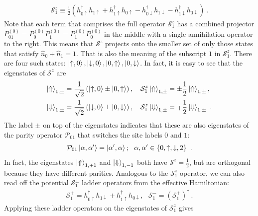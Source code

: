 \documentclass{iopart}
\begin{document}
\begin{eqnarray}
	\mathcal{S}^z_1 \equiv \frac{1}{2}\left(h^\dagger_{0 \uparrow} h_{1 \uparrow}+ h^\dagger_{1 \uparrow} h_{0 \uparrow} - h^\dagger_{0 \downarrow} h_{1 \downarrow} - h^\dagger_{1 \downarrow} h_{0 \downarrow}\right)~.
\end{eqnarray}
Note that each term that comprises the full operator \(\mathcal{S}^z_1\) has a combined projector \(P_{01}^{(0)} = P_0^{(0)}P_1^{(0)} = P_1^{(0)}P_0^{(0)}\) in the middle with a single annihilation operator to the right. This means that \(\mathcal{S}^z\) projects onto the smaller set of only those states that satisfy \(\hat n_0 + \hat n_1 = 1\). That is also the meaning of the subscript \(1\) in \(\mathcal{S}^z_1\). There are four such states: \(\ket{\uparrow, 0}, \ket{\downarrow,0}, \ket{0,\uparrow}, \ket{0, \downarrow}\). In fact, it is easy to see that the eigenstates of \(\mathcal{S}^z\) are
\begin{eqnarray}
	\label{sigmaz-def}
	\ket{\Uparrow}_{1,\pm} &= \frac{1}{\sqrt 2}\left(\ket{\uparrow,0} \pm \ket{0, \uparrow}\right), \quad \mathcal{S}^z_1\ket{\Uparrow}_{1,\pm} = \pm\frac{1}{2}\ket{\Uparrow}_{1,\pm}, \\
	\ket{\Downarrow}_{1,\pm} &= \frac{1}{\sqrt 2}\left( \ket{\downarrow, 0} \pm \ket{0, \downarrow}\right),\quad \mathcal{S}^z_1\ket{\Downarrow}_{1,\pm} = \mp\frac{1}{2}\ket{\Downarrow}_{1,\pm}~.
\end{eqnarray}
The label \(\pm\) on top of the eigenstates indicates that these are also eigenstates of the parity operator \(\mathcal{P}_{01}\) that switches the site labels \(0\) and \(1\):
\begin{eqnarray}
	\label{parity-define}
	\mathcal{P}_{01}\ket{\alpha,\alpha^\prime} = \ket{\alpha^\prime,\alpha};~~ \alpha,\alpha^\prime \in \left\{0,\uparrow,\downarrow,2\right\} ~.
\end{eqnarray}
In fact, the eigenstates \(\ket{\Uparrow}_{1,+1}\) and \(\ket{\Downarrow}_{1,-1}\) both have \(\mathcal{S}^z = \frac{1}{2}\), but are orthogonal because they have different parities. Analogous to the \(\mathcal{S}_1^z\) operator, we can also read off the potential \(\mathcal{S}_1^\pm\) ladder operators from the effective Hamiltonian:
\begin{eqnarray}
	\label{sigmapm-def}
	\mathcal{S}_1^+ = h^\dagger_{0 \uparrow} h_{1 \downarrow} + h^\dagger_{1 \uparrow} h_{0 \downarrow}, ~ ~ ~\mathcal{S}_1^- = \left(\mathcal{S}_1^+\right)^\dagger~.
\end{eqnarray}
Applying these ladder operators on the eigenstates of \(\mathcal{S}_1^z\) gives
\end{document}
